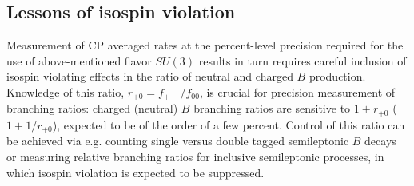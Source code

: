 \subsection{Lessons of isospin violation}
Measurement of CP averaged rates at the percent-level precision required for the use of above-mentioned flavor $SU(3)$ results in turn requires careful inclusion of isospin violating effects in the ratio of neutral and charged $B$ production. Knowledge of this ratio, $r_{+0} = f_{+-}/f_{00}$, is crucial for precision measurement of branching ratios:  charged (neutral) $B$ branching ratios are sensitive to $1 + r_{+0}$ ($1 + 1/r_{+0}$),  expected to be of the order of a few percent. Control of this ratio can be achieved via e.g. counting single versus double tagged semileptonic $B$ decays or measuring relative branching ratios for inclusive semileptonic processes, in which isospin violation is expected to be suppressed. 

%

\endinput

%




